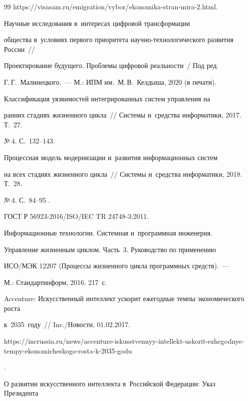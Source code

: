 {{\begin{thebibliography}{99}
{https://\linebreak visasam.ru/emigration/vybor/ekonomika-stran-mira-2.html}.


 Научные исследования в~интересах цифровой трансформации 

общества в~условиях первого приоритета научно-технологического развития России~/\!\!/ 

Проектирование будущего. Проблемы цифровой реальности~/ Под ред. 

Г.\,Г.~Малинецкого.~--- М.: ИПМ им.\ М.\,В.~Келдыша, 2020 (в печати).


 Классификация уязвимостей интегрированных систем управления на 

ранних стадиях жизненного цикла~/\!\!/ Системы и~средства информатики, 2017. Т.~27. 

№\,4. С.~132--143.


 Процессная модель модернизации и~развития информационных систем 

на всех стадиях жизненного цикла~/\!\!/ Системы и~средства информатики, 2018. Т.~28. 

№\,4. С.~84--95 .



ГОСТ Р 56923-2016/ISO/IEC TR 24748-3:2011. 

Информационные технологии. Системная и~программная инженерия. 

Управление жизненным циклом. Часть~3. Руководство по применению 

ИСО/МЭК 12207 (Процессы жизненного цикла программных средств).~--- 

М.: Стандартинформ, 2016. 217~с.




Accenture: Искусственный интеллект ускорит ежегодные темпы экономического рос\-та 

к~2035~году~/\!\!/ Inc./Новости, 01.02.2017. {\sf 

 https://incrussia.ru/news/accenture-iskusstvennyy-intellekt-uskorit-ezhegodnye-tempy-ekonomicheskogo-rosta-k-2035-godu}.


О развитии искусственного интеллекта в~Российской Федерации: Указ Президента 


\end{thebibliography}}}
